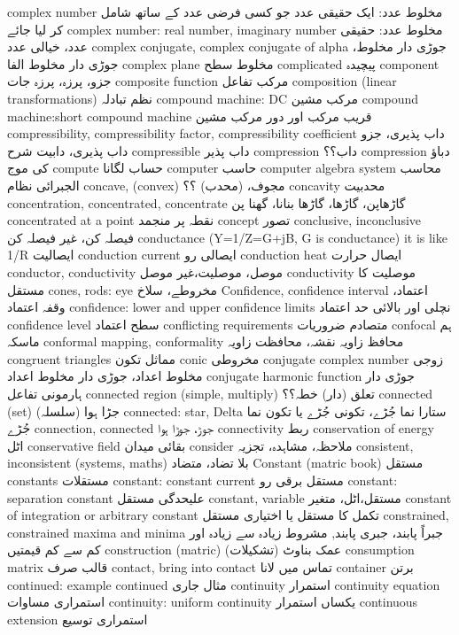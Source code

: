 complex number	مخلوط عدد: ایک حقیقی عدد جو کسی فرضی عدد کے ساتھ شامل کر لیا جائے
complex number: real number, imaginary number	مخلوط عدد: حقیقی عدد، خیالی عدد
complex conjugate, complex conjugate of alpha	جوڑی دار مخلوط، جوڑی دار مخلوط الفا
complex plane	مخلوط سطح
complicated	پیچیدہ
component	جزو، پرزہ، پرزہ جات
composite function	مرکب تفاعل
composition (linear transformations)	نظم تبادلہ
compound machine: DC	مرکب مشین
compound machine:short compound machine	قریب مرکب اور دور مرکب مشین
compressibility, compressibility factor, compressibility coefficient	داب پذیری، جزو داب پذیری، دابیت شرح
compressible	داب پذیر
compression	داب؟؟
compression	دباؤ کی موج
compute	حساب لگانا
computer	حاسب
computer algebra system	محاسب الجبرائی نظام
concave, (convex)	مجوف، (محدب) ؟؟
concavity	محدبیت
concentration, concentrated, concentrate	گاڑھاپن، گاڑھا، گاڑھا بنانا، گھنا پن
concentrated at a point	نقطہ پر منجمد
concept	تصور
conclusive, inconclusive	فیصلہ کن، غیر فیصلہ کن
conductance (Y=1/Z=G+jB, G is conductance) it is like 1/R	ایصالیت
conduction current	ایصالی رو
conduction heat	ایصال حرارت
conductor, conductivity	موصل، موصلیت،غیر موصل
conductivity	موصلیت کا مستقل
cones, rods: eye	مخروطے، سلاخ
Confidence, confidence interval	اعتماد، وقفہ اعتماد
confidence: lower and upper confidence limits	نچلی اور بالائی حد اعتماد
confidence level	سطح اعتماد
conflicting requirements	متصادم ضروریات
confocal	ہم ماسکہ
conformal mapping, conformality	محافظ زاویہ نقشہ، محافظت زاویہ
congruent triangles	مماثل تکون
conic	مخروطی
conjugate complex number	زوجی مخلوط اعداد، جوڑی دار مخلوط اعداد
conjugate harmonic function	جوڑی دار ہارمونی تفاعل
connected region (simple, multiply)	تعلق (دار) خطہ؟؟
connected (set)	جڑا  ہوا (سلسلہ)
connected: star, Delta	ستارا نما جُڑے، تکونی جُڑے یا تکون نما جُڑے
connection, connected	جوڑ، جوڑا ہوا
connectivity	ربط
conservation of energy	اٹل
conservative field	بقائی میدان
consider	ملاحظہ، مشاہدہ، تجزیہ
consistent, inconsistent (systems, maths)	بلا تضاد، متضاد
Constant (matric book)	مستقل
constants	مستقلات
constant: constant current	مستقل برقی رو
constant: separation constant	علیحدگی مستقل
constant, variable	مستقل،اٹل،  متغیر
constant of integration or arbitrary constant	تکمل کا مستقل یا اختیاری مستقل
constrained, constrained maxima and minima	جبراً پابند، جبری پابند, مشروط زیادہ سے زیادہ اور کم سے کم قیمتیں
construction (matric)	عمک بناوٹ (تشکیلات)
consumption matrix	قالب صرف
contact, bring into contact	تماس میں لانا
container	برتن
continued: example continued	مثال جاری
continuity	استمرار
continuity equation	استمراری مساوات
continuity: uniform continuity	یکساں استمرار
continuous extension	استمراری توسیع

